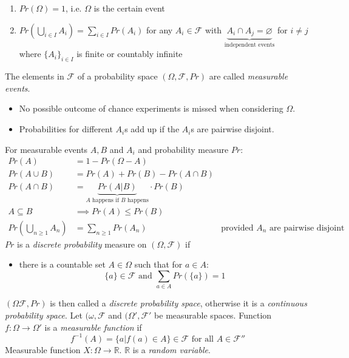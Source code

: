 \documentclass[a4paper, 10pt]{article}
\newcommand{\underbraceset}[2]{\underset{#1}{\underbrace{#2}}}
\begin{document}
\begin{mdframed}
\begin{itemize}
\begin{enumerate}
        \item $Pr(\Omega)=1$, i.e. $\Omega$ is the certain event
        \item $Pr\left( \bigcup_{i\in I}A_i \right)=\sum_{i\in I} Pr(A_i)$ for any $A_i\in\mathcal{F}$ with $\underbraceset{\text{independent events}}{A_i\cap A_j=\varnothing}$ for $i\not= j$ where $\{A_i\}_{i\in I}$ is finite or countably infinite
    \end{enumerate}
\end{itemize}
The elements in $\mathcal{F}$ of a probability space $(\Omega,\mathcal{F},Pr)$ are called \emph{measurable events}.
\begin{itemize}
    \item No possible outcome of chance experiments is missed when considering $\Omega$.
    \item Probabilities for different $A_i$s add up if the $A_i$s are pairwise disjoint.
\end{itemize}
For measurable events $A,B$ and $A_i$ and probability measure $Pr$:
\begin{align*}
Pr(A) &= 1-Pr(\Omega-A) \\
Pr(A\cup B) &= Pr(A)+Pr(B)-Pr(A\cap B) \\
Pr(A\cap B) &= \underbraceset{\text{$A$ happens if $B$ happens}}{Pr(A|B)}\cdot Pr(B) \\
A\subseteq B &\implies Pr(A)\leq Pr(B) \\
Pr(\bigcup_{n\geq 1} A_n) &= \sum_{n\geq1}Pr(A_n) & \text{provided $A_n$ are pairwise disjoint}
\end{align*}
$Pr$ is a \emph{discrete probability} measure on $(\Omega,\mathcal{F})$ if
\begin{itemize}
    \item there is a countable set $A\in\Omega$ such that for $a\in A$:
    \[
    \{a\}\in\mathcal{F} \text{ and } \sum_{a\in A}Pr(\{a\})=1
    \]
\end{itemize}
$(\Omega\mathcal{F},Pr)$ is then called a \emph{discrete probability space}, otherwise it is a \emph{continuous probability space}.
Let $(\omega,\mathcal{F}$ and $(\Omega',\mathcal{F}'$ be measurable spaces. Function $f:\Omega\to\Omega'$ is a \emph{measurable function} if
\[
f^{-1}(A) = \{a|f(a)\in A\}\in\mathcal{F} \text{ for all } A\in\mathcal{F}''
\]
Measurable function $X:\Omega\to\mathds{R}$. $\mathds{R}$ is a \emph{random variable}. \\

\end{mdframed}
\end{document}
